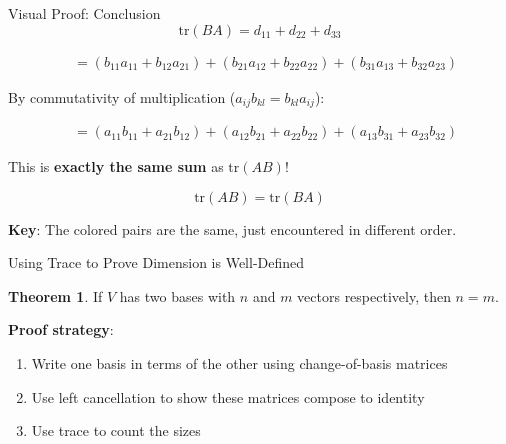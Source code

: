 \documentclass[10pt]{beamer}
\theoremstyle{definition}
\newtheorem{thm}{Theorem}[section]
\newcommand{\x}[1]{\alert{\textbf{#1}}}
\begin{document}
\begin{frame}{Visual Proof: Conclusion}
$$\text{tr}(BA) = d_{11} + d_{22} + d_{33}$$

\begin{align*}
&= (b_{11}a_{11} + b_{12}a_{21}) + (b_{21}a_{12} + b_{22}a_{22}) + (b_{31}a_{13} + b_{32}a_{23})
\end{align*}

\vfill
By commutativity of multiplication ($a_{ij}b_{kl} = b_{kl}a_{ij}$):

\begin{align*}
&= (a_{11}b_{11} + a_{21}b_{12}) + (a_{12}b_{21} + a_{22}b_{22}) + (a_{13}b_{31} + a_{23}b_{32})
\end{align*}

\vfill
This is \x{exactly the same sum} as $\text{tr}(AB)$!

$$\boxed{\text{tr}(AB) = \text{tr}(BA)}$$

\x{Key}: The colored pairs are the same, just encountered in different order.
\end{frame}

\begin{frame}{Using Trace to Prove Dimension is Well-Defined}
\begin{thm}
If $V$ has two bases with $n$ and $m$ vectors respectively, then $n = m$.
\end{thm}

\vfill
\textbf{Proof strategy}:
\begin{enumerate}
\item Write one basis in terms of the other using change-of-basis matrices
\item Use left cancellation to show these matrices compose to identity
\item Use trace to count the sizes
\end{enumerate}
\end{frame}
\end{document}

